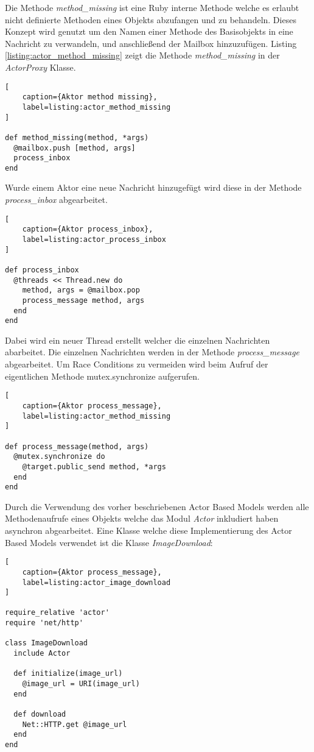Die Methode \emph{method\_missing} ist eine Ruby interne Methode welche es erlaubt nicht definierte Methoden eines Objekts abzufangen und zu behandeln. Dieses Konzept wird genutzt um den Namen einer Methode des Basisobjekts in eine Nachricht zu verwandeln, und anschließend der Mailbox hinzuzufügen. Listing \ref{listing:actor_method_missing} zeigt die Methode \emph{method\_missing} in der \emph{ActorProxy} Klasse. 

\begin{lstlisting}[
	caption={Aktor method missing},
	label=listing:actor_method_missing
]

def method_missing(method, *args)
  @mailbox.push [method, args]
  process_inbox
end
\end{lstlisting}


Wurde einem Aktor eine neue Nachricht hinzugefügt wird diese in der Methode \emph{process\_inbox} abgearbeitet. 

\begin{lstlisting}[
	caption={Aktor process_inbox},
	label=listing:actor_process_inbox
]

def process_inbox
  @threads << Thread.new do
    method, args = @mailbox.pop
    process_message method, args
  end
end
\end{lstlisting}	

Dabei wird ein neuer Thread erstellt welcher die einzelnen Nachrichten abarbeitet. Die einzelnen Nachrichten werden in der Methode \emph{process\_message} abgearbeitet. Um Race Conditions zu vermeiden wird beim Aufruf der eigentlichen Methode mutex.synchronize aufgerufen. 


\begin{lstlisting}[
	caption={Aktor process_message},
	label=listing:actor_method_missing
]

def process_message(method, args)
  @mutex.synchronize do
    @target.public_send method, *args
  end
end
\end{lstlisting}	

Durch die Verwendung des vorher beschriebenen Actor Based Models werden alle Methodenaufrufe eines Objekts welche das Modul \emph{Actor} inkludiert haben asynchron abgearbeitet. Eine Klasse welche diese Implementierung des Actor Based Models verwendet ist die Klasse \emph{ImageDownload}:

\begin{lstlisting}[
	caption={Aktor process_message},
	label=listing:actor_image_download
]

require_relative 'actor'
require 'net/http'

class ImageDownload
  include Actor

  def initialize(image_url)
    @image_url = URI(image_url)
  end

  def download
    Net::HTTP.get @image_url
  end
end
\end{lstlisting}

